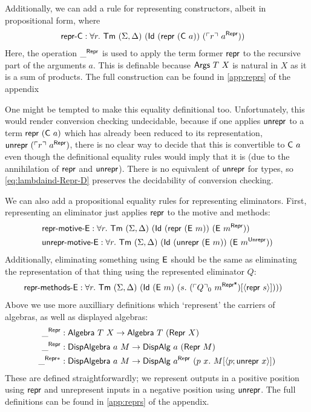 Additionally, we can add a rule for representing constructors, albeit in propositional form, where
\begin{align*}
&\mta{repr-C} : \forall r.\ \Tm\ (\Sigma, \Delta)\ (\mta{Id}\ (\Mrepr\ (\mta{C}\ a))\ (\emb{r}\ a^\mta{Repr}))
\end{align*}
Here, the operation $\_^{\textsf{Repr}}$ is used to apply the term former
$\textsf{repr}$ to the recursive part of the arguments $a$. This is definable
because $\mta{Args}\ T\ X$ is natural in $X$ as it is a sum of products. The
full construction can be found in \cref{app:reprs} of the appendix

One might be tempted to make this equality definitional too. Unfortunately, this
would render conversion checking undecidable, because if one applies
$\textsf{unrepr}$ to a term $\textsf{repr}\ (\textsf{C}\ a)$ which has already been reduced
to its representation, $\textsf{unrepr}\ (\ulcorner r \urcorner\ a^{\textsf{Repr}})$, there is no
clear way to decide that this is convertible to $\textsf{C}\ a$ even though the
definitional equality rules would imply that it is (due
to the annihilation of $\textsf{repr}$ and $\textsf{unrepr}$). There is no
equivalent of $\textsf{unrepr}$ for types, so \eqref{eq:lambdaind-Repr-D} preserves
the decidability of conversion checking.


We can also add a propositional equality rules for representing eliminators.
First, representing an eliminator just applies $\textsf{repr}$ to the motive and methods:
\begin{align*}
&\mta{repr-motive-E} : \forall r.\ \Tm\ (\Sigma, \Delta)\ (\mta{Id}\ (\Mrepr\ (\mta{E}\ m))\ (\mta{E}\ m^\mta{Repr})) \\
&\mta{unrepr-motive-E} : \forall r.\ \Tm\ (\Sigma, \Delta)\ (\mta{Id}\ (\Munrepr\ (\mta{E}\ m))\ (\mta{E}\ m^\mta{Unrepr}))
\end{align*}
Additionally, eliminating something using $\textsf{E}$ should be the same as
eliminating the representation of that thing using the represented eliminator $Q$:
\begin{align*}
&\mta{repr-methods-E} : \forall r.\ \Tm\ (\Sigma, \Delta)\ (\mta{Id}\ (\mta{E}\ m)\ (s.\ (\emb{Q}_0\ m^{\mta{Repr*}})[\Msub{\mta{repr}\ s}])))
\end{align*}
Above we use more auxilliary definitions which `represent' the carriers of
algebras, as well as displayed algebras:
\begin{align*}
\_^{\mta{Repr}} &: \mta{Algebra}\ T\ X \to \mta{Algebra}\ T\ (\mta{Repr}\ X) \\
 \_^{\mta{Repr}} &: \mta{DispAlgebra}\ a\ M \to \mta{DispAlg}\ a\ (\MRepr\ M) \\
 \_^{\mta{Repr}*} &: \mta{DispAlgebra}\ a\ M \to \mta{DispAlg}\ a^{\mta{Repr}}\ (p\ x .\ M[\Msub{p;\mta{unrepr}\ x}])
\end{align*}
These are defined straightforwardly; we represent outputs in a positive position
using $\textsf{repr}$ and unrepresent inputs in a negative position using
$\textsf{unrepr}$. The full definitions can be found in \cref{app:reprs} of the
appendix.

